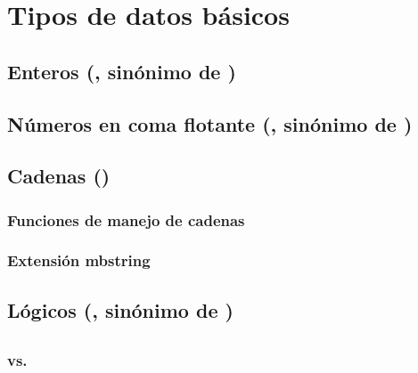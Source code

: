 \documentclass[a4paper,11pt,spanish]{sphinxmanual}
\begin{document}
\section{Tipos de datos básicos}
\label{\detokenize{php:tipos-de-datos-basicos}}

\subsection{Enteros (, sinónimo de )}
\label{\detokenize{php:enteros-int-sinonimo-de-integer}}

\subsection{Números en coma flotante (, sinónimo de )}
\label{\detokenize{php:numeros-en-coma-flotante-float-sinonimo-de-double}}

\subsection{Cadenas ()}
\label{\detokenize{php:cadenas-string}}

\subsubsection{Funciones de manejo de cadenas}
\label{\detokenize{php:funciones-de-manejo-de-cadenas}}

\subsubsection{Extensión mbstring}
\label{\detokenize{php:extension-mbstring}}

\subsection{Lógicos (, sinónimo de )}
\label{\detokenize{php:logicos-bool-sinonimo-de-boolean}}

\subsection{}
\label{\detokenize{php:null}}

\subsubsection{ vs. }
\label{\detokenize{php:is-null-vs-null}}
\end{document}
